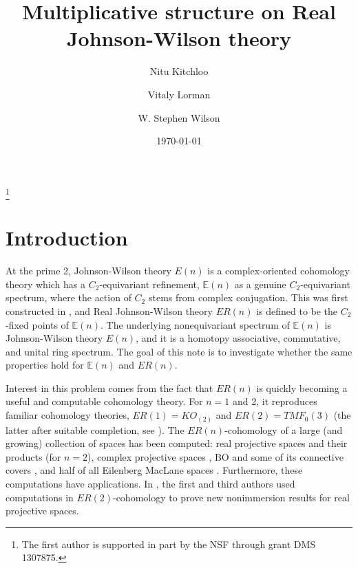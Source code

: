\documentclass[12pt]{amsart}
\numberwithin{equation}{section}
\theoremstyle{plain}  %
\theoremstyle{definition}  %
\newcommand{\cp}{\mathbb{C}P^\infty}
\newcommand{\E}{\mathbb{E}}
\begin{document}
\pagestyle{plain}

\title
{Multiplicative structure on Real Johnson-Wilson theory}
\author{Nitu Kitchloo}
\address{Department of Mathematics, Johns Hopkins University, Baltimore, USA}
\author{Vitaly Lorman}
\address{Department of Mathematics, University of Rochester, Rochester, USA}
\author{W. Stephen Wilson}
\address{Department of Mathematics, Johns Hopkins University, Baltimore, USA}
\thanks{The first author is supported in part by the NSF through grant DMS
  1307875.}
\date{\today}



\maketitle

\section{Introduction}
At the prime 2, Johnson-Wilson theory $E(n)$ \cite{JW73} is a complex-oriented cohomology theory which has a $C_2$-equivariant refinement, $\E(n)$ as a genuine $C_2$-equivariant spectrum, where the action of $C_2$ stems from complex conjugation. This was first constructed in \cite{HK01}, and Real Johnson-Wilson theory $ER(n)$ is defined to be the $C_2$-fixed points of $\E(n)$. The underlying nonequivariant spectrum of $\E(n)$ is Johnson-Wilson theory $E(n)$, and it is a homotopy associative, commutative, and unital ring spectrum. The goal of this note is to investigate whether the same properties hold for $\E(n)$ and $ER(n)$. 
\medskip
\noindent

Interest in this problem comes from the fact that $ER(n)$ is quickly becoming a useful and computable cohomology theory. For $n=1$ and 2, it reproduces familiar cohomology theories, $ER(1)=KO_{(2)}$ and $ER(2)=TMF_0(3)$ (the latter after suitable completion, see \cite{HM16}). The $ER(n)$-cohomology of a large (and growing) collection of spaces has been computed: real projective spaces and their products \cite{KW08a, KW08b, Ban13} (for $n=2$), complex projective spaces \cite{Lor16, KLW16b}, $\text{BO}$ and some of its connective covers \cite{KW14, KLW16b}, and half of all Eilenberg MacLane spaces \cite{KLW16a, KLW16b}. Furthermore, these computations have applications. In \cite{KW08a, KW08b}, the first and third authors used computations in $ER(2)$-cohomology to prove new nonimmersion results for real projective spaces.
\medskip
\noindent
\end{document}
